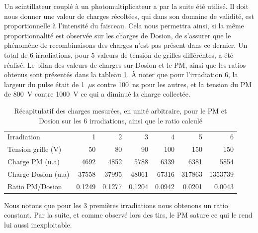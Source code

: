 \documentclass[a4paper,11pt]{article}
\begin{document}
Un scintillateur couplé à un photomultiplicateur a par la suite été utilisé.
Il doit nous donner une valeur de charges récoltées, qui dans son domaine de validité, est proportionnelle à l'intensité du faisceau.
Cela nous permettra ainsi, si la même proportionnalité est observée sur les charges de Dosion, de s'assurer que le phénomène de recombinaisons des charges n'est pas présent dans ce dernier.
Un total de 6 irradiations, pour 5 valeurs de tension de grilles différentes, a été réalisé.
Le bilan des valeurs de charges sur Dosion et le PM, ainsi que les ratios obtenus sont présentés dans la tableau \ref{tab:pmdosion}.
\`A noter que pour l'irradiation 6, la largeur du pulse était de 1~$\mu$s contre 100~ns pour les autres, et la tension du PM de 800~V contre 1000~V ce qui a diminué la charge collectée.

\begin{table}
\begin{center}
\begin{tabular}{l|rrrrrr}
Irradiation&1&2&3&4&5&6\\
Tension grille (V)&50&80&90&100&150&150\\
\hline
Charge PM (u.a)&4692&4852	&5788&6339&6381&5854\\
Charge Dosion (u.a)&37558&37995&48061&67316&317863&1353739\\
Ratio PM/Dosion&0.1249&0.1277&0.1204&0.0942&0.0201&0.0043\\
\hline
\end{tabular}
\caption{\label{tab:pmdosion}\footnotesize{Récapitulatif des charges mesurées, en unité arbitraire, pour le PM et Dosion sur les 6 irradiations, ainsi que le ratio calculé}}
\end{center}
\end{table}

Nous notons que pour les 3 premières irradiations nous obtenons un ratio constant.
Par la suite, et comme observé lors des tirs, le PM sature ce qui le rend lui aussi inexploitable.
\end{document}
